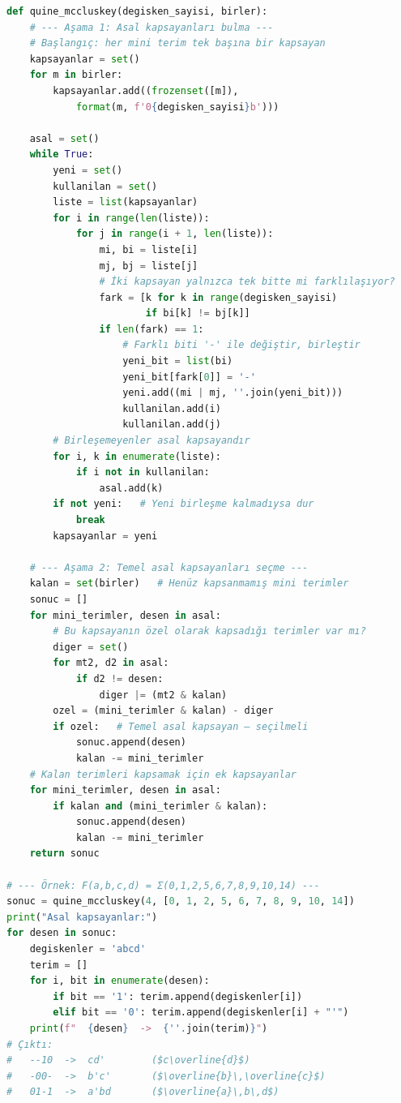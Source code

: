 \begin{lstlisting}[language=Python, caption={Quine--McCluskey algoritması: Python ile sıfırdan gerçekleme}, basicstyle=\ttfamily\scriptsize]
def quine_mccluskey(degisken_sayisi, birler):
    # --- Aşama 1: Asal kapsayanları bulma ---
    # Başlangıç: her mini terim tek başına bir kapsayan
    kapsayanlar = set()
    for m in birler:
        kapsayanlar.add((frozenset([m]),
            format(m, f'0{degisken_sayisi}b')))

    asal = set()
    while True:
        yeni = set()
        kullanilan = set()
        liste = list(kapsayanlar)
        for i in range(len(liste)):
            for j in range(i + 1, len(liste)):
                mi, bi = liste[i]
                mj, bj = liste[j]
                # İki kapsayan yalnızca tek bitte mi farklılaşıyor?
                fark = [k for k in range(degisken_sayisi)
                        if bi[k] != bj[k]]
                if len(fark) == 1:
                    # Farklı biti '-' ile değiştir, birleştir
                    yeni_bit = list(bi)
                    yeni_bit[fark[0]] = '-'
                    yeni.add((mi | mj, ''.join(yeni_bit)))
                    kullanilan.add(i)
                    kullanilan.add(j)
        # Birleşemeyenler asal kapsayandır
        for i, k in enumerate(liste):
            if i not in kullanilan:
                asal.add(k)
        if not yeni:   # Yeni birleşme kalmadıysa dur
            break
        kapsayanlar = yeni

    # --- Aşama 2: Temel asal kapsayanları seçme ---
    kalan = set(birler)   # Henüz kapsanmamış mini terimler
    sonuc = []
    for mini_terimler, desen in asal:
        # Bu kapsayanın özel olarak kapsadığı terimler var mı?
        diger = set()
        for mt2, d2 in asal:
            if d2 != desen:
                diger |= (mt2 & kalan)
        ozel = (mini_terimler & kalan) - diger
        if ozel:   # Temel asal kapsayan — seçilmeli
            sonuc.append(desen)
            kalan -= mini_terimler
    # Kalan terimleri kapsamak için ek kapsayanlar
    for mini_terimler, desen in asal:
        if kalan and (mini_terimler & kalan):
            sonuc.append(desen)
            kalan -= mini_terimler
    return sonuc

# --- Örnek: F(a,b,c,d) = Σ(0,1,2,5,6,7,8,9,10,14) ---
sonuc = quine_mccluskey(4, [0, 1, 2, 5, 6, 7, 8, 9, 10, 14])
print("Asal kapsayanlar:")
for desen in sonuc:
    degiskenler = 'abcd'
    terim = []
    for i, bit in enumerate(desen):
        if bit == '1': terim.append(degiskenler[i])
        elif bit == '0': terim.append(degiskenler[i] + "'")
    print(f"  {desen}  ->  {''.join(terim)}")
# Çıktı:
#   --10  ->  cd'        ($c\overline{d}$)
#   -00-  ->  b'c'       ($\overline{b}\,\overline{c}$)
#   01-1  ->  a'bd       ($\overline{a}\,b\,d$)
\end{lstlisting}

